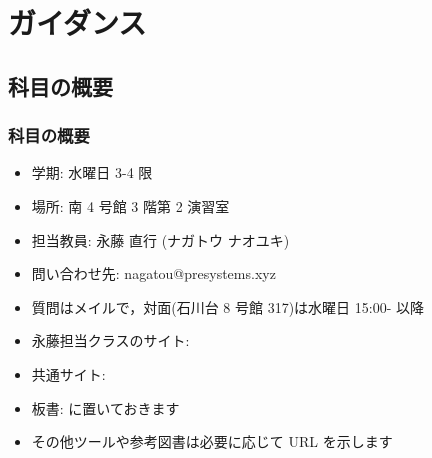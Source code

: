 \section{ガイダンス}
%
%
\subsection{科目の概要}
\begin{frame}
\frametitle{科目の概要}
  \begin{itemize}
\item 学期: 水曜日 3-4 限
\item 場所: 南 4 号館 3 階第 2 演習室
\item 担当教員: 永藤 直行 (ナガトウ ナオユキ)
\item 問い合わせ先: nagatou@presystems.xyz
\item 質問はメイルで，対面(石川台 8 号館 317)は水曜日 15:00- 以降
\item 永藤担当クラスのサイト: \href{https://sites.google.com/presystems.xyz/elementarycs/top}{} 
\item 共通サイト: \href{https://wakita.github.io/classes/years/y23/cs1/course.html}{}
\item 板書: \href{https://mitou-my.sharepoint.com/:o:/g/personal/nnagato_mitou_org/Ei5nV0iuNsRJlWDG4f5NAHkBINXV2nMagLjcqF1uL2BfJA?e=bbc0sd}{} に置いておきます
\item その他ツールや参考図書は必要に応じて URL を示します
  \end{itemize}
\end{frame}
%
%

